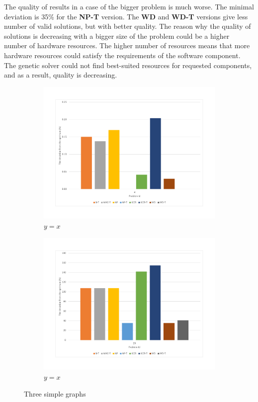 The quality of results in a case of the bigger problem is much worse. The minimal deviation is 35\% for the \textbf{NP-T} version. The \textbf{WD} and \textbf{WD-T} versions give less number of valid solutions, but with better quality. The reason why the quality of solutions is decreasing with a bigger size of the problem could be a higher number of hardware resources. The higher number of resources means that more hardware resources could satisfy the requirements of the software component. The genetic solver could not find best-suited resources for requested components, and as a result, quality is decreasing. 


\begin{figure}
	\centering
	\begin{subfigure}{0.45\textwidth}
		\includegraphics[width=\textwidth]{images/EnergyDeviationSmallProblem.pdf}
		\caption{$y=x$}
		\label{fig:SmallProblemEnergy}
	\end{subfigure}
	\hfill
	\begin{subfigure}{0.45\textwidth}
		\includegraphics[width=\textwidth]{images/EnergyDeviationMediumProblem.pdf}
		\caption{$y=x$}
		\label{fig:MediumProblemEnergy}
	\end{subfigure}    
	\caption{Three simple graphs}
	\label{fig:SmallMediumProblemEnergy}    
\end{figure}


